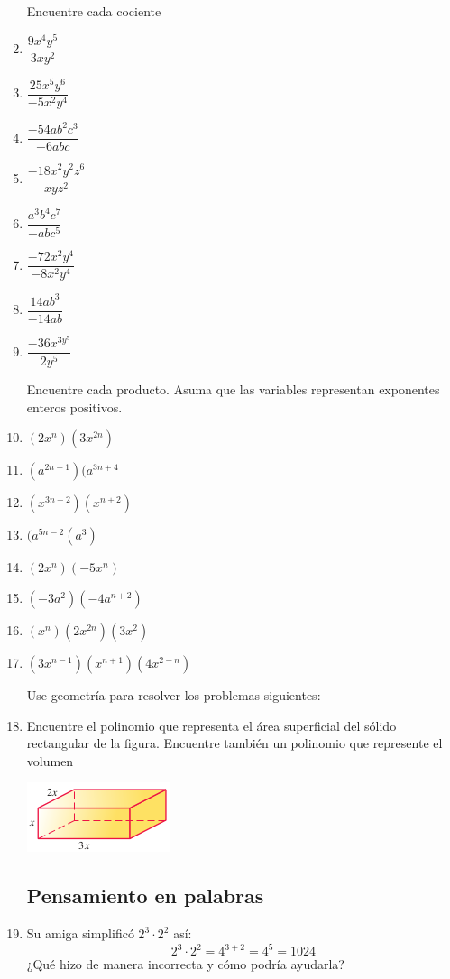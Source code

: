 \documentclass[letterpaper,11pt,twoside]{article}
\begin{document}
\begin{multicols}{2}
\begin{enumerate}
 Encuentre cada cociente 
 
 \item $\dfrac{9x^{4}y^{5}}{3xy^{2}}$
 \item $\dfrac{25x^{5}y^{6}}{-5x^{2}y^{4}}$
 \item $\dfrac{-54ab^{2}c^{3}}{-6abc}$
 \item $\dfrac{-18x^{2}y^{2}z^{6}}{xyz^{2}}$
 \item $\dfrac{a^{3}b^{4}c^{7}}{-abc^{5}}$
 \item $\dfrac{-72x^{2}y^{4}}{-8x^{2}y^{4}}$
 \item $\dfrac{14ab^{3}}{-14ab}$
 \item $\dfrac{-36x^{3y^{5}}}{2y^{5}}$
 
 Encuentre cada producto. Asuma que las variables representan exponentes enteros positivos.
 
 \item $(2x^{n})(3x^{2n})$
 \item $(a^{2n-1})(a^{3n+4}$
 \item $(x^{3n-2})(x^{n+2})$
 \item $(a^{5n-2}(a^{3})$
 \item $(2x^{n})(-5x^{n})$
 \item $(-3a^{2})(-4a^{n+2})$
 \item $(x^{n})(2x^{2n})(3x^{2})$
 \item $(3x^{n-1})(x^{n+1})(4x^{2-n})$
 
 Use geometría para resolver los problemas siguientes:
 
 \item Encuentre el polinomio que representa el área superficial del sólido rectangular de la figura. Encuentre también un polinomio que represente el volumen
 \begin{center}
 \includegraphics[scale=1]{Images/solido02.png} 
 \end{center}
 \subsection*{Pensamiento en palabras}
 \item Su amiga simplificó $2^{3}\cdot 2^{2}$ así:
 \[2^{3}\cdot 2^{2}=4^{3+2}=4^{5}=1024\]
 ¿Qu\'{e} hizo de manera incorrecta y c\'{o}mo podr\'{i}a ayudarla?
 \end{enumerate}

\end{multicols}
\end{document}
